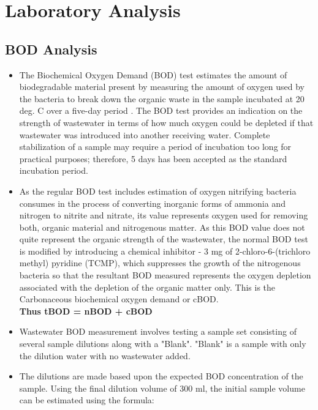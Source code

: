\section{Laboratory Analysis}

		\subsection{BOD Analysis}		
\begin{itemize}
\setlength\itemsep{1em}

\item The Biochemical Oxygen Demand (BOD) test estimates the amount of biodegradable material present by measuring the amount of oxygen used by the bacteria to break down the organic waste in the sample incubated at 20 deg. C over a five-day period . The BOD test provides an indication on the strength of wastewater in terms of how much oxygen could be depleted if that wastewater was introduced into another receiving water.  Complete stabilization of a sample may require a period of incubation too long for practical purposes; therefore, 5 days has been accepted as the standard incubation period.

\item As the regular BOD test includes estimation of oxygen nitrifying bacteria consumes in the process of converting inorganic forms of ammonia and nitrogen to nitrite and nitrate, its value represents oxygen used for removing both, organic material and nitrogenous matter.  As this BOD value does not quite represent the organic strength of the wastewater, the normal BOD test is modified by introducing a chemical inhibitor - 3 mg of 2-chloro-6-(trichloro methyl) pyridine (TCMP), which suppresses the growth of the nitrogenous bacteria so that the resultant BOD measured represents the oxygen depletion associated with the depletion of the organic matter only.  This is the Carbonaceous biochemical oxygen demand or cBOD. \\
\vspace{0.4cm}
\textbf{Thus tBOD = nBOD + cBOD}

\item Wastewater BOD measurement involves testing a sample set consisting of several sample dilutions along with a "Blank".  "Blank" is a sample with only the dilution water with no wastewater added. \\


\item The dilutions are made based upon the expected BOD concentration of the sample.  Using the final dilution volume of 300 ml, the initial sample volume can be estimated using the formula:\\


\end{itemize}
